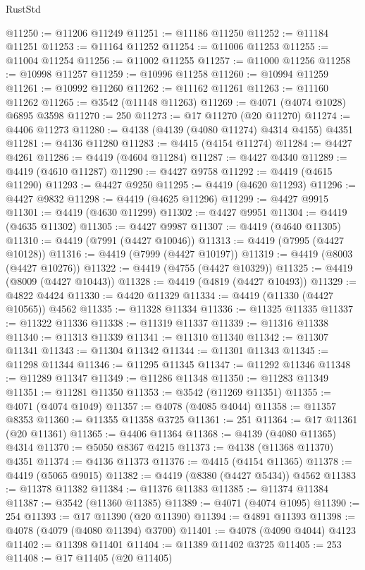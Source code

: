 \begin{lexlean}{RustStd}
\begin{coremodule}
@11250 := @11206 @11249
@11251 := @11186 @11250
@11252 := @11184 @11251
@11253 := @11164 @11252
@11254 := @11006 @11253
@11255 := @11004 @11254
@11256 := @11002 @11255
@11257 := @11000 @11256
@11258 := @10998 @11257
@11259 := @10996 @11258
@11260 := @10994 @11259
@11261 := @10992 @11260
@11262 := @11162 @11261
@11263 := @11160 @11262
@11265 := @3542 (@11148 @11263)
@11269 := @4071 (@4074 @1028) @6895 @3598
@11270 := 250
@11273 := @17 @11270 (@20 @11270)
@11274 := @4406 @11273
@11280 := @4138 (@4139 (@4080 @11274) @4314 @4155) @4351
@11281 := @4136 @11280
@11283 := @4415 (@4154 @11274)
@11284 := @4427 @4261
@11286 := @4419 (@4604 @11284)
@11287 := @4427 @4340
@11289 := @4419 (@4610 @11287)
@11290 := @4427 @9758
@11292 := @4419 (@4615 @11290)
@11293 := @4427 @9250
@11295 := @4419 (@4620 @11293)
@11296 := @4427 @9832
@11298 := @4419 (@4625 @11296)
@11299 := @4427 @9915
@11301 := @4419 (@4630 @11299)
@11302 := @4427 @9951
@11304 := @4419 (@4635 @11302)
@11305 := @4427 @9987
@11307 := @4419 (@4640 @11305)
@11310 := @4419 (@7991 (@4427 @10046))
@11313 := @4419 (@7995 (@4427 @10128))
@11316 := @4419 (@7999 (@4427 @10197))
@11319 := @4419 (@8003 (@4427 @10276))
@11322 := @4419 (@4755 (@4427 @10329))
@11325 := @4419 (@8009 (@4427 @10443))
@11328 := @4419 (@4819 (@4427 @10493))
@11329 := @4822 @4424
@11330 := @4420 @11329
@11334 := @4419 (@11330 (@4427 @10565)) @4562
@11335 := @11328 @11334
@11336 := @11325 @11335
@11337 := @11322 @11336
@11338 := @11319 @11337
@11339 := @11316 @11338
@11340 := @11313 @11339
@11341 := @11310 @11340
@11342 := @11307 @11341
@11343 := @11304 @11342
@11344 := @11301 @11343
@11345 := @11298 @11344
@11346 := @11295 @11345
@11347 := @11292 @11346
@11348 := @11289 @11347
@11349 := @11286 @11348
@11350 := @11283 @11349
@11351 := @11281 @11350
@11353 := @3542 (@11269 @11351)
@11355 := @4071 (@4074 @1049)
@11357 := @4078 (@4085 @4044)
@11358 := @11357 @8353
@11360 := @11355 @11358 @3725
@11361 := 251
@11364 := @17 @11361 (@20 @11361)
@11365 := @4406 @11364
@11368 := @4139 (@4080 @11365) @4314
@11370 := @5050 @8367 @4215
@11373 := @4138 (@11368 @11370) @4351
@11374 := @4136 @11373
@11376 := @4415 (@4154 @11365)
@11378 := @4419 (@5065 @9015)
@11382 := @4419 (@8380 (@4427 @5434)) @4562
@11383 := @11378 @11382
@11384 := @11376 @11383
@11385 := @11374 @11384
@11387 := @3542 (@11360 @11385)
@11389 := @4071 (@4074 @1095)
@11390 := 254
@11393 := @17 @11390 (@20 @11390)
@11394 := @4891 @11393
@11398 := @4078 (@4079 (@4080 @11394) @3700)
@11401 := @4078 (@4090 @4044) @4123
@11402 := @11398 @11401
@11404 := @11389 @11402 @3725
@11405 := 253
@11408 := @17 @11405 (@20 @11405)

\end{coremodule}
\end{lexlean}
